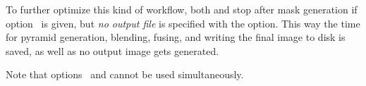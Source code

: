 To further optimize this kind of workflow, both \App{} and \OtherApp{} stop after mask
generation if option~ is given, but \emph{no output file} is specified with
the  option.  This way the time for pyramid generation, blending, fusing, and
writing the final image to disk is saved, as well as no output image gets generated.

Note that options~ and  cannot be used simultaneously.


